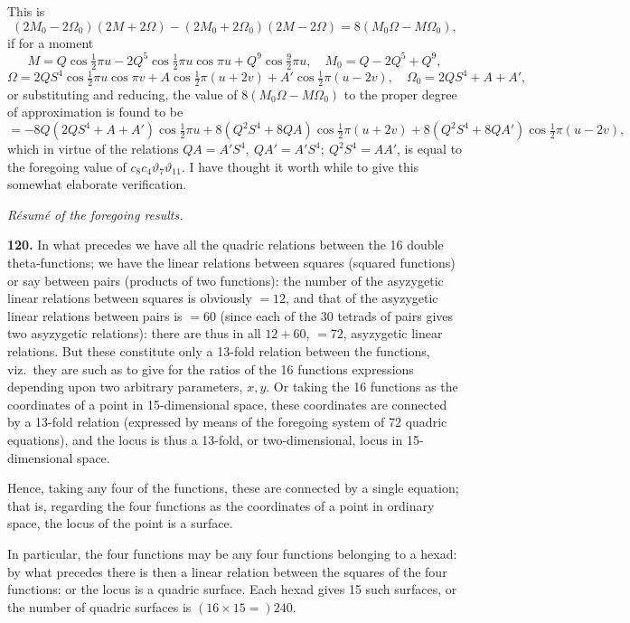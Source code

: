 \documentclass[11pt]{article}
\begin{document}
\medskip
This is
\[
(2M_0 - 2\Omega_0)(2M + 2\Omega) - (2M_0 + 2\Omega_0)(2M - 2\Omega) = 8(M_0\Omega - M\Omega_0),
\]
if for a moment
\[
M = Q\cos\tfrac{1}{2}\pi u - 2Q^5\cos\tfrac{1}{2}\pi u\cos\pi u + Q^9\cos\tfrac{9}{2}\pi u,\quad M_0 = Q - 2Q^5 + Q^9,
\]
\[
\Omega = 2QS^4\cos\tfrac{1}{2}\pi u\cos\pi v + A\cos\tfrac{1}{2}\pi(u+2v) + A'\cos\tfrac{1}{2}\pi(u-2v),\quad \Omega_0 = 2QS^4 + A + A',
\]
or substituting and reducing, the value of $8(M_0\Omega - M\Omega_0)$ to the proper degree of approximation is found to be
\[
= -8Q(2QS^4 + A + A')\cos\tfrac{1}{2}\pi u + 8(Q^2S^4 + 8QA)\cos\tfrac{1}{2}\pi(u+2v) + 8(Q^2S^4 + 8QA')\cos\tfrac{1}{2}\pi(u-2v),
\]
which in virtue of the relations $QA = A'S^4,\ QA' = A'S^4;\ Q^2S^4 = AA'$, is equal to the foregoing value of $c_8c_4\vartheta_7\vartheta_{11}$. I have thought it worth while to give this somewhat elaborate verification.

\medskip
\begin{center}\textit{R\'esum\'e of the foregoing results.}\end{center}

\medskip
\textbf{120.} In what precedes we have all the quadric relations between the 16 double theta-functions; we have the linear relations between squares (squared functions) or say between pairs (products of two functions): the number of the asyzygetic linear relations between squares is obviously $= 12$, and that of the asyzygetic linear relations between pairs is $= 60$ (since each of the 30 tetrads of pairs gives two asyzygetic relations): there are thus in all $12 + 60$, $=72$, asyzygetic linear relations. But these constitute only a 13-fold relation between the functions, viz.\ they are such as to give for the ratios of the 16 functions expressions depending upon two arbitrary parameters, $x, y$. Or taking the 16 functions as the coordinates of a point in 15-dimensional space, these coordinates are connected by a 13-fold relation (expressed by means of the foregoing system of 72 quadric equations), and the locus is thus a 13-fold, or two-dimensional, locus in 15-dimensional space.

\medskip
Hence, taking any four of the functions, these are connected by a single equation; that is, regarding the four functions as the coordinates of a point in ordinary space, the locus of the point is a surface.

\medskip
In particular, the four functions may be any four functions belonging to a hexad: by what precedes there is then a linear relation between the squares of the four functions: or the locus is a quadric surface. Each hexad gives 15 such surfaces, or the number of quadric surfaces is $(16 \times 15 =) 240$.
\end{document}
